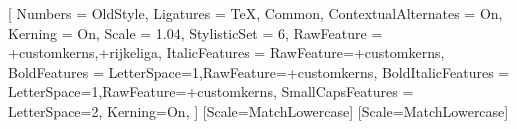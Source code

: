 \setmainfont{EB Garamond}[
  Numbers = OldStyle,
  Ligatures = {TeX, Common},
  ContextualAlternates = On,
  Kerning = On,
  Scale = 1.04, StylisticSet = {6},
  RawFeature = {+customkerns,+rijkeliga},
  ItalicFeatures = {RawFeature={+customkerns}},
  BoldFeatures = {LetterSpace=1,RawFeature={+customkerns}},
  BoldItalicFeatures = {LetterSpace=1,RawFeature={+customkerns}},
  SmallCapsFeatures = {LetterSpace=2, Kerning=On},
  ]
\setsansfont{TeX Gyre Heros}[Scale=MatchLowercase]
\setmonofont{Inconsolatazi4}[Scale=MatchLowercase]
\linespread{1.12}

\newcommand{\VersionFontName}{EB Garamond}







